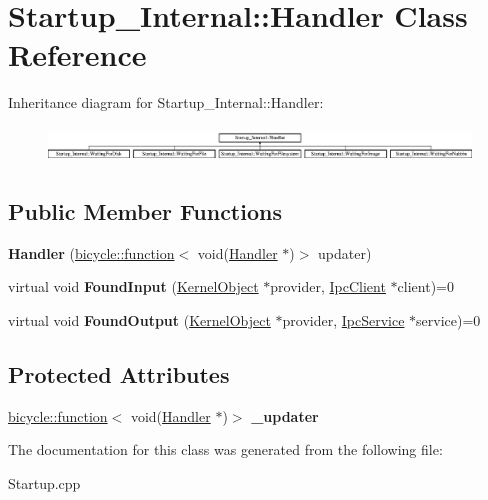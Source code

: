 \hypertarget{class_startup___internal_1_1_handler}{}\section{Startup\+\_\+\+Internal\+:\+:Handler Class Reference}
\label{class_startup___internal_1_1_handler}
Inheritance diagram for Startup\+\_\+\+Internal\+:\+:Handler\+:\begin{figure}[H]
\begin{center}
\leavevmode
\includegraphics[height=0.953192cm]{class_startup___internal_1_1_handler}
\end{center}
\end{figure}
\subsection*{Public Member Functions}
\begin{DoxyCompactItemize}
\item 
\mbox{\label{class_startup___internal_1_1_handler_a8d10f849a4e9e97cc161beaa074b7b3c}} 
{\bfseries Handler} (\hyperlink{classbicycle_1_1function}{bicycle\+::function}$<$ void(\hyperlink{class_startup___internal_1_1_handler}{Handler} $\ast$)$>$ updater)
\item 
\mbox{\label{class_startup___internal_1_1_handler_a0f1676197cbb4c403e1caf56f94a5f21}} 
virtual void {\bfseries Found\+Input} (\hyperlink{class_kernel_object}{Kernel\+Object} $\ast$provider, \hyperlink{class_ipc_client}{Ipc\+Client} $\ast$client)=0
\item 
\mbox{\label{class_startup___internal_1_1_handler_acd357ca0cbbd721227238c75f8a8e7aa}} 
virtual void {\bfseries Found\+Output} (\hyperlink{class_kernel_object}{Kernel\+Object} $\ast$provider, \hyperlink{class_ipc_service}{Ipc\+Service} $\ast$service)=0
\end{DoxyCompactItemize}
\subsection*{Protected Attributes}
\begin{DoxyCompactItemize}
\item 
\mbox{\label{class_startup___internal_1_1_handler_a6568d82309ad571797abacbcc4ae7e9e}} 
\hyperlink{classbicycle_1_1function}{bicycle\+::function}$<$ void(\hyperlink{class_startup___internal_1_1_handler}{Handler} $\ast$)$>$ {\bfseries \+\_\+updater}
\end{DoxyCompactItemize}


The documentation for this class was generated from the following file\+:\begin{DoxyCompactItemize}
\item 
Startup.\+cpp\end{DoxyCompactItemize}
